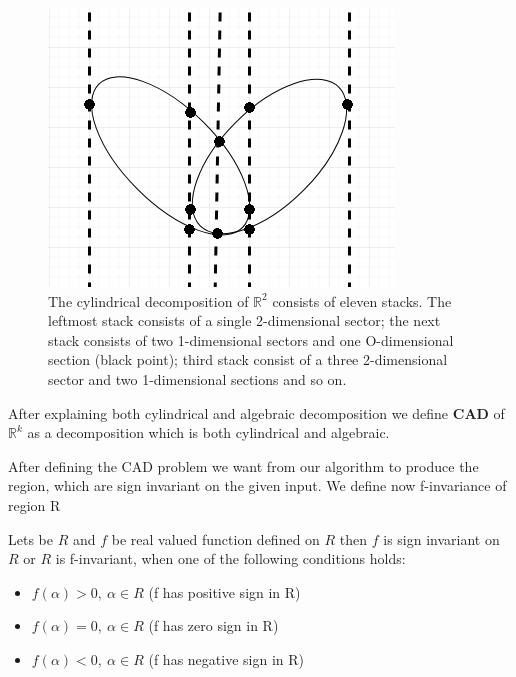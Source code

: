 \documentclass[
  digital, %
  twoside, %
  table,   %
  nolof,     %
  nolot,     %
]{fithesis3}
\begin{document}
\begin{figure}[H]
  \begin{center}
      \begin{minipage}{0.4\textwidth}
          \includegraphics[width=\textwidth]{fithesis/images/cadExample1.png}
    \end{minipage}
  \end{center}
  \caption{The cylindrical decomposition of $\mathbb{R}^2$ consists of eleven stacks. The leftmost stack consists of a single 2-dimensional sector; the next stack consists of
two 1-dimensional sectors and one O-dimensional section (black point); third stack consist of a three 2-dimensional sector and two 1-dimensional sections and so on.}
\end{figure}

After explaining both cylindrical and algebraic decomposition we define \textbf{CAD} of $\mathbb{R}^k$ as a decomposition which is both cylindrical and algebraic.

After defining the CAD problem we want from our algorithm to produce the region, which are sign invariant on the given input. We define now f-invariance of region R


\begin{definition}
Lets be $R$ and $f$ be real valued function defined on $R$ then $f$ is sign invariant on $R$ or $R$ is f-invariant, when one of the following conditions holds:
\begin{itemize}
  \itemsep0em 
    \item $f(\alpha) > 0,\ \alpha \in R$ (f has positive sign in R) 
    \item $f(\alpha) = 0,\ \alpha \in R$ (f has zero sign in R)
    \item $f(\alpha) < 0,\ \alpha \in R$ (f has negative sign in R) 
\end{itemize}
\end{definition}
\end{document}
